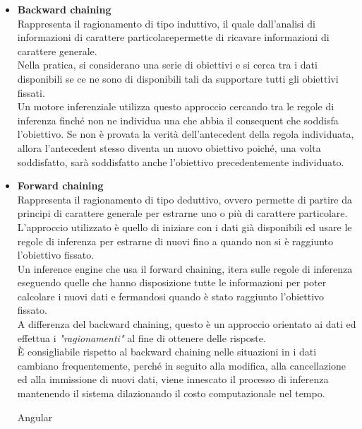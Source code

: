 \begin{itemize}
	 
	 \item \textbf{Backward chaining} \\
	 Rappresenta il ragionamento di tipo induttivo, il quale dall'analisi di informazioni di carattere particolarepermette di ricavare informazioni di carattere generale. \\
	 Nella pratica, si considerano una serie di obiettivi e si cerca tra i dati disponibili se ce ne sono di disponibili tali da supportare tutti gli obiettivi fissati.\\
	 Un motore inferenziale utilizza questo approccio cercando tra le regole di inferenza finché non ne individua una che abbia il consequent che soddisfa l'obiettivo.
	 Se non è provata la verità dell'antecedent della regola individuata, allora l'antecedent stesso diventa un nuovo obiettivo poiché, una volta soddisfatto, sarà soddisfatto anche l'obiettivo precedentemente individuato.  
	 
	 
	\item \textbf{Forward chaining} \\
	 Rappresenta il ragionamento di tipo deduttivo, ovvero permette di partire da principi di carattere generale per estrarne uno o più di carattere particolare.\\
	 L'approccio utilizzato è quello di iniziare con i dati già disponibili ed usare le regole di inferenza per estrarne di nuovi fino a quando non si è raggiunto l'obiettivo fissato.\\
	 Un inference engine che usa il forward chaining, itera sulle regole di inferenza eseguendo quelle che hanno disposizione tutte le informazioni per poter calcolare i nuovi dati  e fermandosi quando è stato raggiunto l'obiettivo fissato.  \\
	 A differenza del backward chaining, questo è un approccio orientato ai dati ed effettua i \textit{"ragionamenti"} al fine di ottenere delle risposte. \\
	 È consigliabile rispetto al backward chaining nelle situazioni in i dati cambiano frequentemente, perché in seguito alla modifica, alla cancellazione ed alla immissione di nuovi dati, viene innescato il processo di inferenza mantenendo il sistema dilazionando il costo computazionale nel tempo.

		 
		 
		 
		
		 
		 \gls{Angular}
\end{itemize} 
 
 
 
